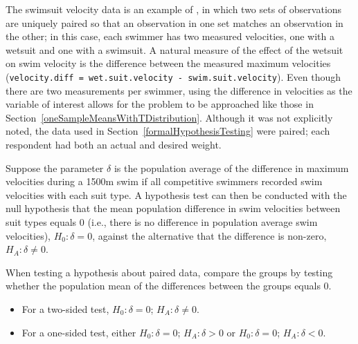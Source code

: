 %
%


	
The swimsuit velocity data is an example of , in which two sets of observations  are uniquely paired so that an observation in one set matches an observation in the other; in this case, each swimmer has two measured velocities, one with a wetsuit and one with a swimsuit. A natural measure of the effect of the wetsuit on swim velocity is the difference between the measured maximum velocities (\texttt{velocity.diff = wet.suit.velocity - swim.suit.velocity}). Even though there are two measurements per swimmer, using the difference in velocities as the variable of interest allows for the problem to be approached like those in Section~\ref{oneSampleMeansWithTDistribution}.  Although it was not explicitly noted, the data used in Section~\ref{formalHypothesisTesting} were paired; each respondent had both an actual and desired weight.

Suppose the parameter $\delta$ is the population average of the difference in maximum velocities during a 1500m swim if all competitive swimmers recorded swim velocities with each suit type. A hypothesis test can then be conducted with the null hypothesis that the mean population difference in swim velocities between suit types equals 0 (i.e., there is no difference in population average swim velocities), $H_0: \delta = 0$, against the alternative that the difference is non-zero, $H_A: \delta \neq 0$.

\begin{termBox}{
When testing a hypothesis about paired data, compare the groups by testing whether the population mean of the differences between the groups equals 0.
\begin{itemize}
\item For a two-sided test, $H_0: \delta = 0$; $H_A: \delta \neq 0$.
\item For a one-sided test, either $H_0: \delta = 0$; $H_A: \delta > 0$ or  $H_0: \delta = 0$; $H_A: \delta < 0$.
\end{itemize}
}
\end{termBox}

